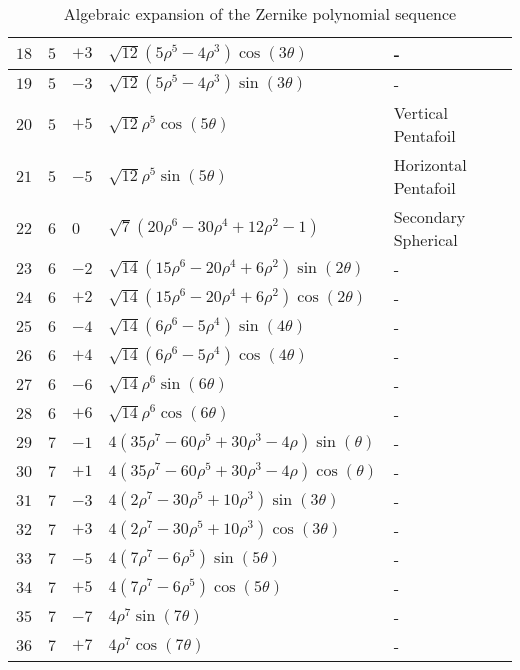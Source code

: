 \begin{table}
\begin{tabular}{ | p{2cm} | p{1.5cm} | p{2cm} | p{6.25cm} | p{4cm} |}
		$18$ & $5$ & $+3$ & $\sqrt{12}\left(5\rho^{5} - 4\rho^{3}\right) \cos(3\theta)$ & - \\ \hline
		$19$ & $5$ & $-3$ & $\sqrt{12}\left(5\rho^{5} - 4\rho^{3}\right) \sin(3\theta)$ & - \\ \hline
		$20$ & $5$ & $+5$ & $\sqrt{12}\rho^{5} \cos(5\theta)$ & Vertical Pentafoil \\ \hline
		$21$ & $5$ & $-5$ & $\sqrt{12}\rho^{5} \sin(5\theta)$ & Horizontal Pentafoil \\ \hline
		$22$ & $6$ & $0$ & $\sqrt{7}\left(20\rho^{6} - 30\rho^{4} + 12\rho^{2} - 1\right)$ & Secondary Spherical \\ \hline
		$23$ & $6$ & $-2$ & $\sqrt{14}\left(15\rho^{6} - 20\rho^{4} + 6\rho^{2}\right)\sin(2\theta)$ & - \\ \hline
		$24$ & $6$ & $+2$ & $\sqrt{14}\left(15\rho^{6} - 20\rho^{4} + 6\rho^{2}\right)\cos(2\theta)$ & - \\ \hline
		$25$ & $6$ & $-4$ & $\sqrt{14}\left(6\rho^{6} - 5\rho^{4}\right)\sin(4\theta)$ & - \\ \hline
		$26$ & $6$ & $+4$ & $\sqrt{14}\left(6\rho^{6} - 5\rho^{4}\right)\cos(4\theta)$ & - \\ \hline
		$27$ & $6$ & $-6$ & $\sqrt{14}\rho^{6}\sin(6\theta)$ & - \\ \hline
		$28$ & $6$ & $+6$ & $\sqrt{14}\rho^{6}\cos(6\theta)$ & - \\ \hline
		$29$ & $7$ & $-1$ & $4\left(35\rho^{7} - 60\rho^{5} + 30\rho^{3} - 4\rho\right) \sin(\theta)$ & - \\ \hline
		$30$ & $7$ & $+1$ & $4\left(35\rho^{7} - 60\rho^{5} + 30\rho^{3} - 4\rho\right) \cos(\theta)$ & - \\ \hline
		$31$ & $7$ & $-3$ & $4\left(2\rho^{7} - 30\rho^{5} + 10\rho^{3}\right) \sin(3\theta)$ & - \\ \hline
		$32$ & $7$ & $+3$ & $4\left(2\rho^{7} - 30\rho^{5} + 10\rho^{3}\right) \cos(3\theta)$ & - \\ \hline
		$33$ & $7$ & $-5$ & $4\left(7\rho^{7} - 6\rho^{5}\right) \sin(5\theta)$ & - \\ \hline
		$34$ & $7$ & $+5$ & $4\left(7\rho^{7} - 6\rho^{5}\right) \cos(5\theta)$ & - \\ \hline
		$35$ & $7$ & $-7$ & $4\rho^{7} \sin(7\theta)$ & - \\ \hline
		$36$ & $7$ & $+7$ & $4\rho^{7} \cos(7\theta)$ & - \\ \hline
	\end{tabular}
	\caption{\label{tab:zernike_expansion}Algebraic expansion of the Zernike polynomial sequence}
\end{table}

